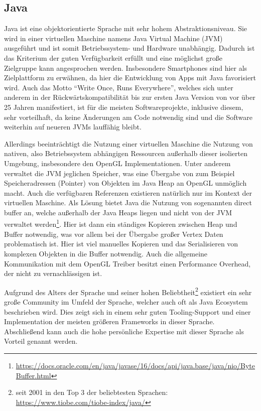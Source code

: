 \subsection{Java}
Java ist eine objektorientierte Sprache mit sehr hohem Abstraktionsniveau. Sie wird in einer virtuellen Maschine namens Java Virtual Machine (JVM) ausgeführt und ist somit Betriebssystem- und Hardware unabhängig. Dadurch ist das Kriterium der guten Verfügbarkeit erfüllt und eine möglichst große Zielgruppe kann angesprochen werden. Insbesondere Smartphones sind hier als Zielplattform zu erwähnen, da hier die Entwicklung von Apps mit Java favorisiert wird. Auch das Motto “Write Once, Runs Everywhere”, welches sich unter anderem in der Rückwärtskompatibilität bis zur ersten Java Version von vor über 25 Jahren manifestiert, ist für die meisten Softwareprojekte, inklusive diesem, sehr vorteilhaft, da keine Änderungen am Code notwendig sind und die Software weiterhin auf neueren JVMs lauffähig bleibt.

Allerdings beeinträchtigt die Nutzung einer virtuellen Maschine die Nutzung von nativen, also Betriebssystem abhängigen Ressourcen außerhalb dieser isolierten Umgebung, insbesondere den OpenGL Implementationen. Unter anderem verwaltet die JVM jeglichen Speicher, was eine Übergabe von zum Beispiel Speicheradressen (Pointer) von Objekten im Java Heap an OpenGL unmöglich macht. Auch die verfügbaren Referenzen existieren natürlich nur im Kontext der virtuellen Maschine. Als Lösung bietet Java die Nutzung von sogenannten direct buffer an, welche außerhalb der Java Heaps liegen und nicht von der JVM verwaltet werden\footnote{\url{https://docs.oracle.com/en/java/javase/16/docs/api/java.base/java/nio/ByteBuffer.html}}. Hier ist dann ein ständiges Kopieren zwischen Heap und Buffer notwendig, was vor allem bei der Übergabe großer Vertex Daten problematisch ist. Hier ist viel manuelles Kopieren und das Serialisieren von komplexen Objekten in die Buffer notwendig. Auch die allgemeine Kommunikation mit dem OpenGL Treiber besitzt einen Performance Overhead, der nicht zu vernachlässigen ist.

Aufgrund des Alters der Sprache und seiner hohen Beliebtheit\footnote{seit 2001 in den Top 3 der beliebtesten Sprachen: \url{https://www.tiobe.com/tiobe-index/java/}} existiert ein sehr große Community im Umfeld der Sprache, welcher auch oft als Java Ecosystem beschrieben wird. Dies zeigt sich in einem sehr guten Tooling-Support und einer Implementation der meisten größeren Frameworks in dieser Sprache. Abschließend kann auch die hohe persönliche Expertise mit dieser Sprache als Vorteil genannt werden.

